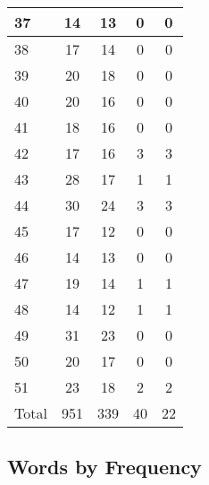 \begin{center}
\begin{longtable}{l|c|c|c|c}
37 & 14 & 13 & 0 & 0\\ \hline
38 & 17 & 14 & 0 & 0\\ \hline
39 & 20 & 18 & 0 & 0\\ \hline
40 & 20 & 16 & 0 & 0\\ \hline
41 & 18 & 16 & 0 & 0\\ \hline
42 & 17 & 16 & 3 & 3\\ \hline
43 & 28 & 17 & 1 & 1\\ \hline
44 & 30 & 24 & 3 & 3\\ \hline
45 & 17 & 12 & 0 & 0\\ \hline
46 & 14 & 13 & 0 & 0\\ \hline
47 & 19 & 14 & 1 & 1\\ \hline
48 & 14 & 12 & 1 & 1\\ \hline
49 & 31 & 23 & 0 & 0\\ \hline
50 & 20 & 17 & 0 & 0\\ \hline
51 & 23 & 18 & 2 & 2\\ \hline
\hline \hline
Total & 951 & 339 & 40 & 22



\end{longtable}
\end{center}

 
\subsection{Words by Frequency}

